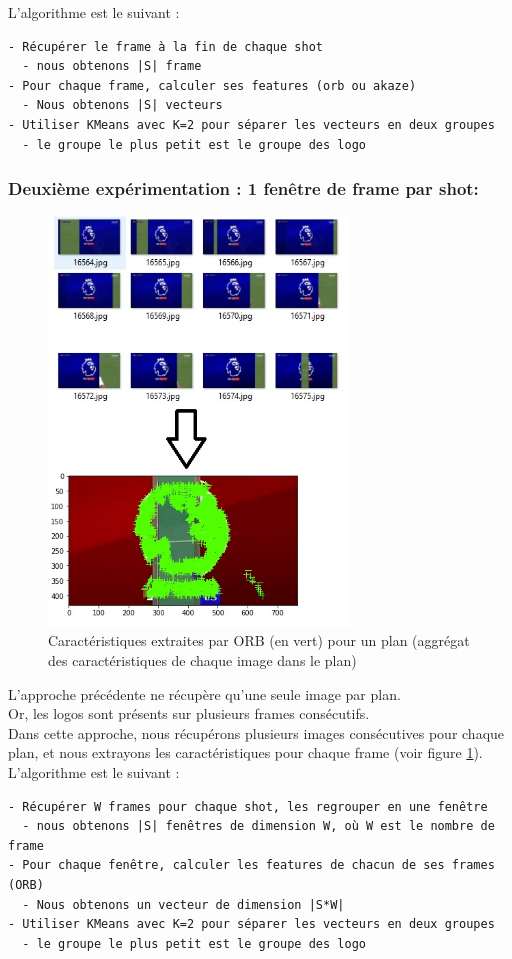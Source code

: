 \documentclass[11pt]{article}
\begin{document}
L'algorithme est le suivant :\\
\begin{verbatim}
- Récupérer le frame à la fin de chaque shot
  - nous obtenons |S| frame
- Pour chaque frame, calculer ses features (orb ou akaze)
  - Nous obtenons |S| vecteurs
- Utiliser KMeans avec K=2 pour séparer les vecteurs en deux groupes
  - le groupe le plus petit est le groupe des logo
\end{verbatim}

\subsubsection{Deuxième expérimentation : 1 fenêtre de frame par shot:}
\label{sec:orgac1964e}
\begin{figure}[htbp]
\centering
\includegraphics[width=8cm]{akaze_window_res.jpg}
\caption{Caractéristiques extraites par ORB (en vert) pour un plan (aggrégat des caractéristiques de chaque image dans le plan) \label{orb-window}}
\end{figure}
L'approche précédente ne récupère qu'une seule image par plan.\\
Or, les logos sont présents sur plusieurs frames consécutifs.\\
Dans cette approche, nous récupérons plusieurs images consécutives pour chaque plan, et nous extrayons les caractéristiques pour chaque frame (voir figure \ref{orb-window}).\\

L'algorithme est le suivant :\\
\begin{verbatim}
- Récupérer W frames pour chaque shot, les regrouper en une fenêtre
  - nous obtenons |S| fenêtres de dimension W, où W est le nombre de frame
- Pour chaque fenêtre, calculer les features de chacun de ses frames (ORB)
  - Nous obtenons un vecteur de dimension |S*W|
- Utiliser KMeans avec K=2 pour séparer les vecteurs en deux groupes
  - le groupe le plus petit est le groupe des logo
\end{verbatim}
\end{document}
